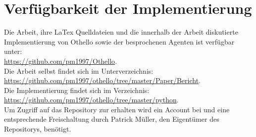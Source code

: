 \chapter*{Verfügbarkeit der Implementierung}
Die Arbeit, ihre LaTex Quelldateien und die innerhalb der Arbeit diskutierte Implementierung von Othello sowie der besprochenen Agenten ist verfügbar unter: 
\\\href{https://github.com/pm1997/Othello}{https://github.com/pm1997/Othello}.
\\Die Arbeit selbst findet sich im Unterverzeichnis:
\\\href{https://github.com/pm1997/othello/tree/master/Paper/Bericht}{https://github.com/pm1997/othello/tree/master/Paper/Bericht}.
\\Die Implementierung findet sich im Verzeichnis:
\\\href{https://github.com/pm1997/othello/tree/master/python}{https://github.com/pm1997/othello/tree/master/python}.
\\Um Zugriff auf das Repository zur erhalten wird ein Account bei  und eine entsprechende Freischaltung durch Patrick Müller, den Eigentümer des Repositorys, benötigt.  